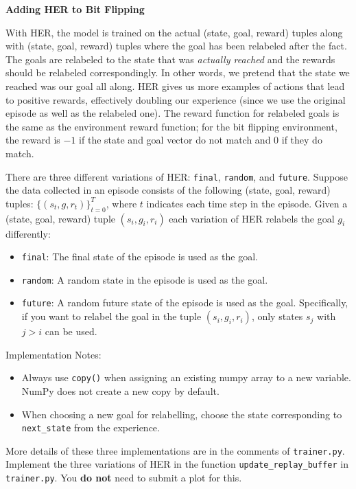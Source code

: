 \item {} \textbf{Adding HER to Bit Flipping}

With HER, the model is trained on the actual (state, goal, reward) tuples along with (state,
goal, reward) tuples where the goal has been relabeled after the fact. The goals are relabeled to the state that was \textit{actually reached} and the rewards should be relabeled correspondingly. In other words, we pretend that the state we reached was our goal all along. HER
gives us more examples of actions that lead to positive rewards, effectively doubling our
experience (since we use the original episode as well as the relabeled one). The reward
function for relabeled goals is the same as the environment reward function; for the bit
flipping environment, the reward is $-1$ if the state and goal vector do not match and 0 if
they do match.

There are three different variations of HER: \texttt{final}, \texttt{random}, and \texttt{future}. Suppose the data collected in an episode consists of the following (state, goal, reward) tuples: $\{(s_t, g, r_t)\}_{t=0}^T$, where $t$ indicates each time step in the episode. Given a (state, goal, reward) tuple $(s_i, g_i, r_i)$ each variation of HER relabels the goal $g_i$ differently:

\begin{itemize}
    \item \texttt{final}: The final state of the episode is used as the goal.
    
    \item \texttt{random}: A random state in the episode is used as the goal.
    
    \item \texttt{future}: A random future state of the episode is used as the goal. Specifically, if you want to relabel the goal in the tuple $(s_i, g_i, r_i)$, only states $s_j$ with $j > i$ can be used.
\end{itemize}

Implementation Notes:

\begin{itemize}
    \item Always use \texttt{copy()} when assigning an existing numpy array to a new variable. NumPy does not create a new copy by default.
    
    \item When choosing a new goal for relabelling, choose the state corresponding to \texttt{next\_state} from the experience.
\end{itemize}

More details of these three implementations are in the comments of \texttt{trainer.py}. Implement the three variations of HER in the function \texttt{update\_replay\_buffer} in \texttt{trainer.py}. You \textbf{do not} need to submit a plot for this.


